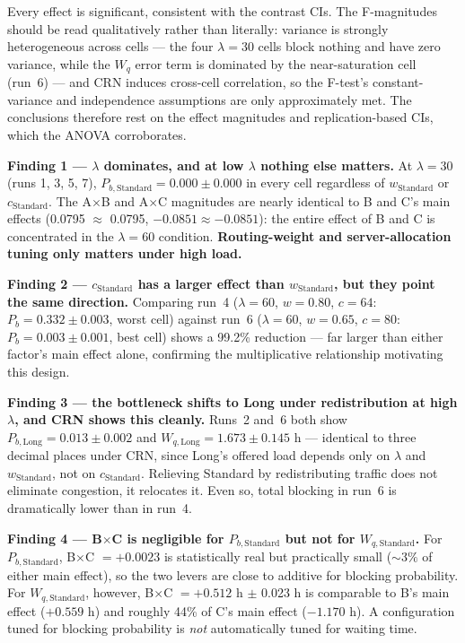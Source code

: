 \documentclass[11pt,a4paper]{article}
\newcommand{\Wq}{\ensuremath{W_q}}
\newcommand{\Pb}{\ensuremath{P_b}}
\newcommand{\lam}{\ensuremath{\lambda}}
\begin{document}
Every effect is significant, consistent with the contrast CIs. The F-magnitudes should be read
qualitatively rather than literally: variance is strongly heterogeneous across cells --- the four
$\lam=30$ cells block nothing and have zero variance, while the $\Wq$ error term is dominated by the
near-saturation cell (run~6) --- and CRN induces cross-cell correlation, so the F-test's
constant-variance and independence assumptions are only approximately met. The conclusions therefore
rest on the effect magnitudes and replication-based CIs, which the ANOVA corroborates.

\textbf{Finding 1 --- $\lam$ dominates, and at low $\lam$ nothing else matters.}
At $\lam=30$ (runs 1, 3, 5, 7), $P_{b,\text{Standard}} = 0.000 \pm 0.000$ in every cell regardless of
$w_\text{Standard}$ or $c_\text{Standard}$. The A$\times$B and A$\times$C magnitudes are nearly
identical to B and C's main effects (0.0795 $\approx$ 0.0795, $-0.0851 \approx -0.0851$): the entire
effect of B and C is concentrated in the $\lam=60$ condition. \textbf{Routing-weight and
server-allocation tuning only matters under high load.}

\textbf{Finding 2 --- $c_\text{Standard}$ has a larger effect than $w_\text{Standard}$, but they point
the same direction.}
Comparing run~4 ($\lam=60$, $w=0.80$, $c=64$: $\Pb=0.332 \pm 0.003$, worst cell) against run~6
($\lam=60$, $w=0.65$, $c=80$: $\Pb=0.003 \pm 0.001$, best cell) shows a 99.2\% reduction ---
far larger than either factor's main effect alone, confirming the multiplicative relationship
motivating this design.

\textbf{Finding 3 --- the bottleneck shifts to Long under redistribution at high $\lam$, and CRN shows
this cleanly.}
Runs~2 and~6 both show $P_{b,\text{Long}} = 0.013 \pm 0.002$ and $W_{q,\text{Long}} = 1.673 \pm 0.145$ h
--- identical to three decimal places under CRN, since Long's offered load depends only on $\lam$ and
$w_\text{Standard}$, not on $c_\text{Standard}$. Relieving Standard by redistributing traffic does
not eliminate congestion, it relocates it. Even so, total blocking in run~6 is dramatically lower than
in run~4.

\textbf{Finding 4 --- B$\times$C is negligible for $P_{b,\text{Standard}}$ but not for $W_{q,\text{Standard}}$.}
For $P_{b,\text{Standard}}$, B$\times$C $= +0.0023$ is statistically real but practically small
(${\sim}3\%$ of either main effect), so the two levers are close to additive for blocking probability.
For $W_{q,\text{Standard}}$, however, B$\times$C $= +0.512$ h $\pm$ 0.023 h is comparable to B's main
effect ($+0.559$ h) and roughly 44\% of C's main effect ($-1.170$ h). A configuration tuned for
blocking probability is \emph{not} automatically tuned for waiting time.
\end{document}

